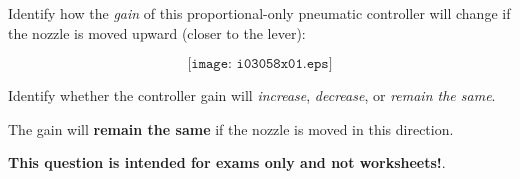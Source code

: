 

Identify how the {\it gain} of this proportional-only pneumatic controller will change if the nozzle is moved upward (closer to the lever):

$$\texttt{[image: i03058x01.eps]}$$

Identify whether the controller gain will {\it increase}, {\it decrease}, or {\it remain the same}.

\vskip 30pt







The gain will {\bf remain the same} if the nozzle is moved in this direction.







{\bf This question is intended for exams only and not worksheets!}.



